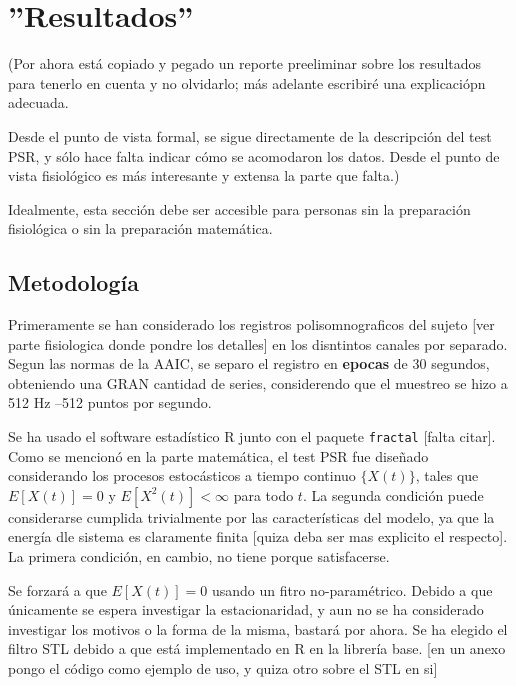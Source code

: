 \chapter{''Resultados''}

(Por ahora est\'a copiado y pegado un reporte preeliminar sobre los resultados
para tenerlo en cuenta y no olvidarlo; m\'as adelante
escribir\'e una explicaci\'opn adecuada.

Desde el punto de vista formal, se sigue directamente de la descripci\'on del test PSR, y s\'olo
hace falta indicar c\'omo se acomodaron los datos. Desde el punto de vista fisiol\'ogico es m\'as
interesante y extensa la parte que falta.)

Idealmente, esta secci\'on debe ser accesible para personas sin la preparaci\'on fisiol\'ogica
o sin la preparaci\'on matem\'atica.


\section{Metodolog\'ia}

Primeramente se han considerado los registros polisomnograficos del sujeto [ver parte fisiologica
donde pondre los detalles] en los disntintos
canales por separado. Segun las normas de la AAIC, se separo el registro en \textbf{epocas}
de 30 segundos, obteniendo una GRAN cantidad de series, considerendo que el muestreo se hizo
a 512 Hz --512 puntos por segundo.

Se ha usado el software estad\'istico R junto con el paquete \texttt{fractal} [falta citar].
Como se mencion\'o en la parte matem\'atica, el test PSR fue dise\~nado considerando los
procesos estoc\'asticos a tiempo continuo $\{X(t)\}$, tales que
$E[X(t)]=0$ y $E\left[ X^{2}(t)\right] < \infty$ para todo $t$. La segunda condici\'on
puede considerarse cumplida trivialmente por las caracter\'isticas del modelo, ya que
la energ\'ia dle sistema es claramente finita [quiza deba ser mas explicito el respecto].
La primera condici\'on, en cambio, no tiene porque satisfacerse.

Se forzar\'a a que $E[X(t)]=0$ usando un fitro no-param\'etrico. Debido a que \'unicamente se
espera investigar la estacionaridad, y aun no se ha considerado investigar los motivos o la forma
de la misma, bastar\'a por ahora. Se ha elegido el filtro STL \cite{Coleman87} debido
a que est\'a implementado en R en la librer\'ia base. [en un anexo pongo el c\'odigo
como ejemplo de uso, y quiza otro sobre el STL en si]

